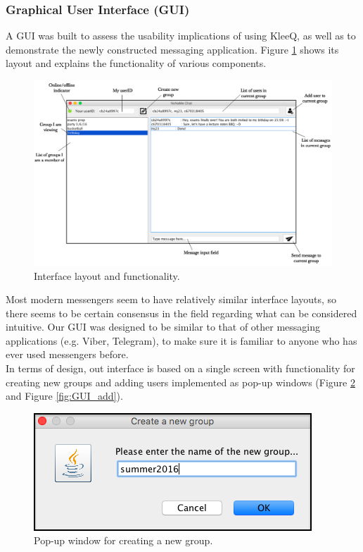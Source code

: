 \documentclass[a4paper, 12pt]{report}
\begin{document}
\subsubsection{Graphical User Interface (GUI)}
A GUI was built to assess the usability implications of using KleeQ, as well as to demonstrate the newly constructed messaging application. Figure \ref{fig:GUI} shows its layout and explains the functionality of various components.
\begin{figure}[H]
    \captionsetup{width=0.84\textwidth}
    \centering
    \includegraphics[width=0.94\linewidth]{pics/GUI.png}
    \caption{\label{fig:GUI} Interface layout and functionality.}
\end{figure}
Most modern messengers seem to have relatively similar interface layouts, so there seems to be certain consensus in the field regarding what can be considered intuitive. Our GUI was designed to be similar to that of other messaging applications (e.g. Viber, Telegram), to make sure it is familiar to anyone who has ever used messengers before. \\

In terms of design, out interface is based on a single screen with functionality for creating new groups and adding users implemented as pop-up windows (Figure \ref{fig:GUI_create} and Figure \ref{fig:GUI_add}).

\begin{figure}[H]
    \captionsetup{width=0.84\textwidth}
    \centering
    \includegraphics[width=0.5\linewidth]{pics/GUI_create.png}
    \caption{\label{fig:GUI_create} Pop-up window for creating a new group.}
\end{figure}
\end{document}
